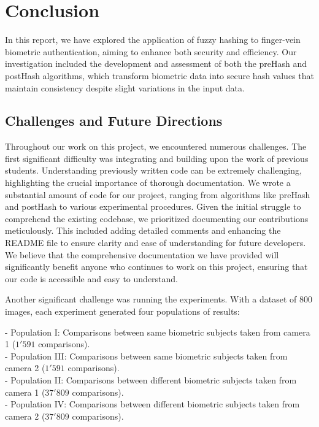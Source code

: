 \newpage

\section{Conclusion}
In this report, we have explored the application of fuzzy hashing to finger-vein biometric authentication, aiming to enhance both security and efficiency. Our investigation included the development and assessment of both the preHash and postHash algorithms, which transform biometric data into secure hash values that maintain consistency despite slight variations in the input data.

\subsection{Challenges and Future Directions}
Throughout our work on this project, we encountered numerous challenges. The first significant difficulty was integrating and building upon the work of previous students. Understanding previously written code can be extremely challenging, highlighting the crucial importance of thorough documentation. We wrote a substantial amount of code for our project, ranging from algorithms like preHash and postHash to various experimental procedures. Given the initial struggle to comprehend the existing codebase, we prioritized documenting our contributions meticulously. This included adding detailed comments and enhancing the README file to ensure clarity and ease of understanding for future developers. We believe that the comprehensive documentation we have provided will significantly benefit anyone who continues to work on this project, ensuring that our code is accessible and easy to understand.

Another significant challenge was running the experiments. With a dataset of 800 images, each experiment generated four populations of results:

- Population I: Comparisons between same biometric subjects taken from camera 1 (\(1'591\) comparisons).\\
- Population III: Comparisons between same biometric subjects taken from camera 2 (\(1'591\) comparisons).\\
- Population II: Comparisons between different biometric subjects taken from camera 1 (\(37'809\) comparisons).\\
- Population IV: Comparisons between different biometric subjects taken from camera 2 (\(37'809\) comparisons).

